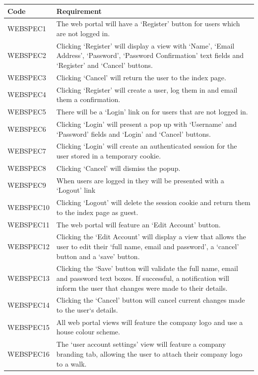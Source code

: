 \documentclass[11pt,a4paper]{article}
\begin{document}
\begin{longtable}{|p{2.5cm}p{13cm}|}
\hline
\textbf{Code} & \textbf{Requirement} \\

\hline
WEBSPEC1 & The web portal will have a `Register' button for users which are not logged in. \\ \hline
WEBSPEC2 & Clicking `Register' will display a view with `Name', `Email Address', `Password', `Password Confirmation' text fields and `Register' and `Cancel' buttons.\\ \hline
WEBSPEC3 & Clicking `Cancel' will return the user to the index page.\\ \hline
WEBSPEC4 & Clicking `Register' will create a user, log them in and email them a confirmation. \\ \hline
WEBSPEC5 & There will be a `Login' link on for users that are not logged in.\\ \hline
WEBSPEC6 & Clicking `Login' will present a pop up with `Username' and `Password' fields and `Login' and `Cancel' buttons. \\ \hline
WEBSPEC7 & Clicking `Login' will create an authenticated session for the user stored in a temporary cookie.\\ \hline
WEBSPEC8 & Clicking `Cancel' will dismiss the popup. \\ \hline
WEBSPEC9 & When users are logged in they will be presented with a `Logout' link\\ \hline
WEBSPEC10 & Clicking `Logout' will delete the session cookie and return them to the index page as guest. \\ \hline
WEBSPEC11 & The web portal will feature an `Edit Account' button. \\ \hline
WEBSPEC12 & Clicking the `Edit Account' will display a view that allows the user to edit their `full name, email and password', a `cancel' button and a `save' button. \\ \hline
WEBSPEC13 & Clicking the `Save' button will validate the full name, email and password text boxes. If successful, a notification will inform the user that changes were made to their details. \\ \hline
WEBSPEC14 & Clicking the `Cancel' button will cancel current changes made to the user`s details. \\ \hline
WEBSPEC15 & All web portal views will feature the company logo and use a house colour scheme. \\ \hline
WEBSPEC16 & The `user account settings' view will feature a company branding tab, allowing the user to attach their company logo to a walk. \\ \hline

\end{longtable}
\end{document}
